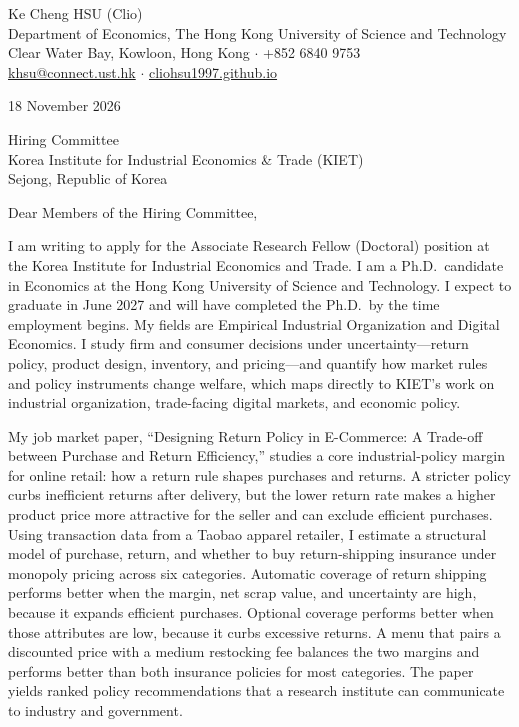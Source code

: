 \documentclass[11pt]{article}
\begin{document}
\begin{flushleft}
Ke Cheng HSU (Clio) \\
Department of Economics, The Hong Kong University of Science and Technology \\
Clear Water Bay, Kowloon, Hong Kong $\cdot$ +852 6840 9753 \\
\href{mailto:khsu@connect.ust.hk}{khsu@connect.ust.hk} $\cdot$ \href{https://cliohsu1997.github.io/}{cliohsu1997.github.io}
\end{flushleft}

18 November 2026

\vspace{0.12em}
Hiring Committee \\
Korea Institute for Industrial Economics \& Trade (KIET) \\
Sejong, Republic of Korea

\vspace{0.12em}
Dear Members of the Hiring Committee,

I am writing to apply for the Associate Research Fellow (Doctoral) position at the Korea Institute for Industrial Economics and Trade. I am a Ph.D.\ candidate in Economics at the Hong Kong University of Science and Technology. I expect to graduate in June 2027 and will have completed the Ph.D.\ by the time employment begins. My fields are Empirical Industrial Organization and Digital Economics. I study firm and consumer decisions under uncertainty---return policy, product design, inventory, and pricing---and quantify how market rules and policy instruments change welfare, which maps directly to KIET's work on industrial organization, trade-facing digital markets, and economic policy.

My job market paper, ``Designing Return Policy in E-Commerce: A Trade-off between Purchase and Return Efficiency,'' studies a core industrial-policy margin for online retail: how a return rule shapes purchases and returns. A stricter policy curbs inefficient returns after delivery, but the lower return rate makes a higher product price more attractive for the seller and can exclude efficient purchases. Using transaction data from a Taobao apparel retailer, I estimate a structural model of purchase, return, and whether to buy return-shipping insurance under monopoly pricing across six categories. Automatic coverage of return shipping performs better when the margin, net scrap value, and uncertainty are high, because it expands efficient purchases. Optional coverage performs better when those attributes are low, because it curbs excessive returns. A menu that pairs a discounted price with a medium restocking fee balances the two margins and performs better than both insurance policies for most categories. The paper yields ranked policy recommendations that a research institute can communicate to industry and government.
\end{document}
